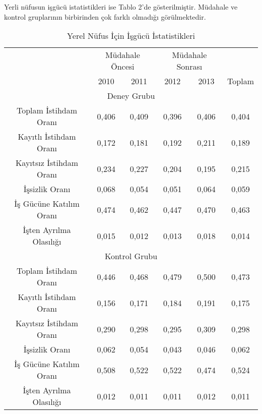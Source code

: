 \documentclass{article}
\begin{document}
\begin{justify}
        Yerli nüfusun işgücü istatistikleri ise Tablo 2'de gösterilmiştir. Müdahale ve kontrol 
        gruplarının birbirinden çok farklı olmadığı görülmektedir.



        \FloatBarrier
        \begin{table}[h]
            \centering
            \caption{Yerel Nüfus İçin İşgücü İstatistikleri}
            \begin{tabular}{|cccccc|}
            \hline
                 & \multicolumn{2}{|c|}{Müdahale Öncesi} & \multicolumn{2}{|c|}{Müdahale Sonrası} &\\
                 & 2010 & 2011 & 2012 & 2013 & Toplam \\ \hline
                \multicolumn{6}{|c|}{Deney Grubu}\\ \hline  
                Toplam İstihdam Oranı  & 0,406 & 0,409 & 0,396 & 0,406 & 0,404 \\  
                Kayıtlı İstihdam Oranı & 0,172 & 0,181 & 0,192 & 0,211 & 0,189 \\ 
                Kayıtsız İstihdam Oranı & 0,234 & 0,227 & 0,204 & 0,195 & 0,215 \\ 
                İşsizlik Oranı & 0,068 & 0,054 & 0,051 & 0,064 & 0,059 \\ 
                İş Gücüne Katılım Oranı & 0,474 & 0,462 & 0,447 & 0,470 & 0,463 \\
                İşten Ayrılma Olasılığı & 0,015 & 0,012 & 0,013 & 0,018 & 0,014 \\ \hline
                \multicolumn{6}{|c|}{Kontrol Grubu}\\ \hline
                Toplam İstihdam Oranı  & 0,446 & 0,468 & 0,479 & 0,500 & 0,473 \\
                Kayıtlı İstihdam Oranı & 0,156 & 0,171 & 0,184 & 0,191 & 0,175 \\ 
                Kayıtsız İstihdam Oranı & 0,290 & 0,298 & 0,295 & 0,309 & 0,298\\ 
                İşsizlik Oranı & 0,062 & 0,054 & 0,043 & 0,046 & 0,062 \\ 
                İş Gücüne Katılım Oranı & 0,508 & 0,522 & 0,522 & 0,474 & 0,524 \\
                İşten Ayrılma Olasılığı & 0,012 & 0,011 & 0,011 & 0,012 & 0,011 \\ \hline
            \end{tabular}
        \end{table}
        \FloatBarrier
    \end{justify}
    
\end{document}
